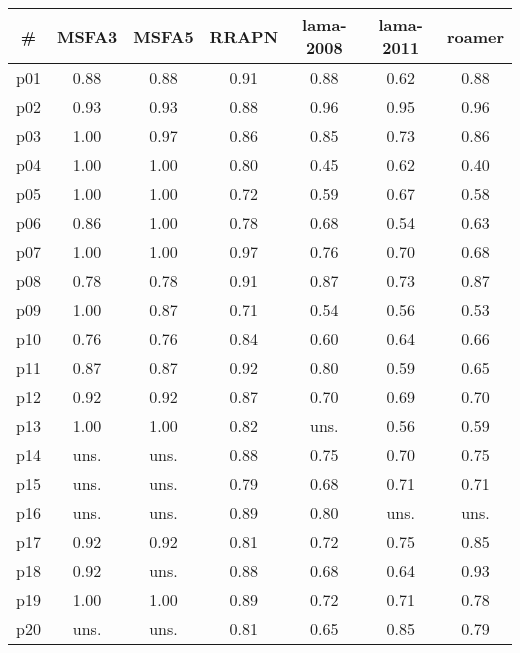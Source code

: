 \begin{tabular}{c||c|c|c|c|c|c}
\textbf{\#} & \textbf{MSFA3} & \textbf{MSFA5} & \textbf{RRAPN} & \textbf{lama-2008} & \textbf{lama-2011} & \textbf{roamer}\\
\hline
\hline
p01 & 0.88 & 0.88 & 0.91 & 0.88 & 0.62 & 0.88\\
p02 & 0.93 & 0.93 & 0.88 & 0.96 & 0.95 & 0.96\\
p03 & 1.00 & 0.97 & 0.86 & 0.85 & 0.73 & 0.86\\
p04 & 1.00 & 1.00 & 0.80 & 0.45 & 0.62 & 0.40\\
p05 & 1.00 & 1.00 & 0.72 & 0.59 & 0.67 & 0.58\\
p06 & 0.86 & 1.00 & 0.78 & 0.68 & 0.54 & 0.63\\
p07 & 1.00 & 1.00 & 0.97 & 0.76 & 0.70 & 0.68\\
p08 & 0.78 & 0.78 & 0.91 & 0.87 & 0.73 & 0.87\\
p09 & 1.00 & 0.87 & 0.71 & 0.54 & 0.56 & 0.53\\
p10 & 0.76 & 0.76 & 0.84 & 0.60 & 0.64 & 0.66\\
p11 & 0.87 & 0.87 & 0.92 & 0.80 & 0.59 & 0.65\\
p12 & 0.92 & 0.92 & 0.87 & 0.70 & 0.69 & 0.70\\
p13 & 1.00 & 1.00 & 0.82 & uns. & 0.56 & 0.59\\
p14 & uns. & uns. & 0.88 & 0.75 & 0.70 & 0.75\\
p15 & uns. & uns. & 0.79 & 0.68 & 0.71 & 0.71\\
p16 & uns. & uns. & 0.89 & 0.80 & uns. & uns.\\
p17 & 0.92 & 0.92 & 0.81 & 0.72 & 0.75 & 0.85\\
p18 & 0.92 & uns. & 0.88 & 0.68 & 0.64 & 0.93\\
p19 & 1.00 & 1.00 & 0.89 & 0.72 & 0.71 & 0.78\\
p20 & uns. & uns. & 0.81 & 0.65 & 0.85 & 0.79\\
\end{tabular}

